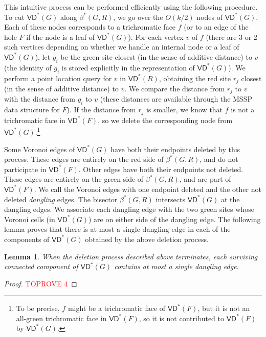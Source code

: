 \documentclass{article}
\newcommand{\VD}{\textsf{VD}}
\newtheorem{lemma}{Lemma}
\begin{document}
This intuitive process can be performed efficiently using the following procedure.
To cut $\VD^*(G)$ along $\beta^*(G,R)$, we go over the $O(k/2)$ nodes of $\VD^*(G)$. Each of these nodes corresponds to a trichromatic face $f$ (or to an edge of the hole $F$ if the node is a leaf of $\VD^*(G)$).
For each vertex $v$ of $f$ (there are 3 or 2 such vertices depending on whether we handle an internal node or a leaf of $\VD^*(G)$), let $g_i$ be the green site closest (in the sense of additive distance) to $v$ (the identity of $g_i$ is stored explicitly in the representation of $\VD^*(G)$).
We perform a point location query for $v$ in $\VD^*(R)$, obtaining the red site $r_j$ closest (in the sense of additive distance) to $v$.
We compare the distance from $r_j$ to $v$ with the distance from $g_i$ to $v$ (these distances are available through the MSSP data structure for $F$). If the distance from $r_j$ is smaller, we know that $f$ is not a trichromatic face in $\VD^*(F)$, so we delete the corresponding node from $\VD^*(G)$.\footnote{To be precise, $f$ might be a trichromatic face of $\VD^*(F)$, but it is not an all-green trichromatic face in $\VD^*(F)$, so it is not contributed to $\VD^*(F)$ by $\VD^*(G)$.}

Some Voronoi edges of $\VD^*(G)$ have both their endpoints deleted by this process. These edges are entirely on the red side of $\beta^*(G,R)$, and do not participate in $\VD^*(F)$. Other edges have both their endpoints not deleted. These edges are entirely on the green side of $\beta^*(G,R)$, and are part of $\VD^*(F)$.
We call the Voronoi edges with one endpoint deleted and the other not deleted {\em dangling} edges.  The bisector $\beta^*(G,R)$ intersects $\VD^*(G)$ at the dangling edges.
We associate each dangling edge with the two green sites whose Voronoi cells (in $\VD^*(G)$) are on either side of the dangling edge.
The following lemma proves that there is at most a single dangling edge in each of the components of $\VD^*(G)$ obtained by the above deletion process.

\begin{lemma}\label{lem:merge_bisector_dangling_edge_components}
When the deletion process described above terminates, each surviving connected component of $\VD^*(G)$ contains at most a single dangling edge.

\end{lemma}

\begin{proof}\textcolor{red}{TOPROVE 4}\end{proof}
\end{document}
